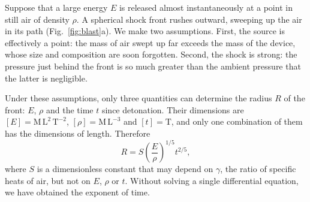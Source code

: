 \documentclass[11pt,a4paper]{article}
\begin{document}
\pn Suppose that a large energy $E$ is released almost instantaneously at a point in still air of density $\rho$. A spherical shock front rushes outward, sweeping up the air in its path (Fig.~\ref{fig:blast}a). We make two assumptions. First, the source is effectively a point: the mass of air swept up far exceeds the mass of the device, whose size and composition are soon forgotten. Second, the shock is strong: the pressure just behind the front is so much greater than the ambient pressure that the latter is negligible.

\pn Under these assumptions, only three quantities can determine the radius $R$ of the front: $E$, $\rho$ and the time $t$ since detonation. Their dimensions are $[E]=\mathrm{M\,L^2\,T^{-2}}$, $[\rho]=\mathrm{M\,L^{-3}}$ and $[t]=\mathrm{T}$, and only one combination of them has the dimensions of length. Therefore
\begin{equation}
  R = S\left(\frac{E}{\rho}\right)^{1/5} t^{2/5},
  \label{eq:scaling}
\end{equation}
where $S$ is a dimensionless constant that may depend on $\gamma$, the ratio of specific heats of air, but not on $E$, $\rho$ or $t$. Without solving a single differential equation, we have obtained the exponent of time.
\end{document}
